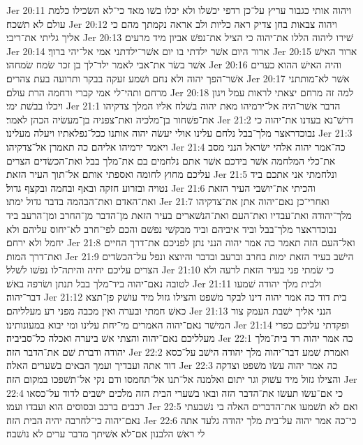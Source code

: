 Jer 20:11  ויהוה אותי כגבור עריץ על־כן רדפי יכשׁלו ולא יכלו בשׁו מאד כי־לא השׂכילו כלמת עולם לא תשׁכח׃
Jer 20:12  ויהוה צבאות בחן צדיק ראה כליות ולב אראה נקמתך מהם כי אליך גליתי את־ריבי׃
Jer 20:13  שׁירו ליהוה הללו את־יהוה כי הציל את־נפשׁ אביון מיד מרעים׃
Jer 20:14  ארור היום אשׁר ילדתי בו יום אשׁר־ילדתני אמי אל־יהי ברוך׃
Jer 20:15  ארור האישׁ אשׁר בשׂר את־אבי לאמר ילד־לך בן זכר שׂמח שׂמחהו׃
Jer 20:16  והיה האישׁ ההוא כערים אשׁר־הפך יהוה ולא נחם ושׁמע זעקה בבקר ותרועה בעת צהרים׃
Jer 20:17  אשׁר לא־מותתני מרחם ותהי־לי אמי קברי ורחמה הרת עולם׃
Jer 20:18  למה זה מרחם יצאתי לראות עמל ויגון ויכלו בבשׁת ימי׃
Jer 21:1  הדבר אשׁר־היה אל־ירמיהו מאת יהוה בשׁלח אליו המלך צדקיהו את־פשׁחור בן־מלכיה ואת־צפניה בן־מעשׂיה הכהן לאמר׃
Jer 21:2  דרשׁ־נא בעדנו את־יהוה כי נבוכדראצר מלך־בבל נלחם עלינו אולי יעשׂה יהוה אותנו ככל־נפלאתיו ויעלה מעלינו׃
Jer 21:3  ויאמר ירמיהו אליהם כה תאמרן אל־צדקיהו׃
Jer 21:4  כה־אמר יהוה אלהי ישׂראל הנני מסב את־כלי המלחמה אשׁר בידכם אשׁר אתם נלחמים בם את־מלך בבל ואת־הכשׂדים הצרים עליכם מחוץ לחומה ואספתי אותם אל־תוך העיר הזאת׃
Jer 21:5  ונלחמתי אני אתכם ביד נטויה ובזרוע חזקה ובאף ובחמה ובקצף גדול׃
Jer 21:6  והכיתי את־יושׁבי העיר הזאת ואת־האדם ואת־הבהמה בדבר גדול ימתו׃
Jer 21:7  ואחרי־כן נאם־יהוה אתן את־צדקיהו מלך־יהודה ואת־עבדיו ואת־העם ואת־הנשׁארים בעיר הזאת מן־הדבר מן־החרב ומן־הרעב ביד נבוכדראצר מלך־בבל וביד איביהם וביד מבקשׁי נפשׁם והכם לפי־חרב לא־יחוס עליהם ולא יחמל ולא ירחם׃
Jer 21:8  ואל־העם הזה תאמר כה אמר יהוה הנני נתן לפניכם את־דרך החיים ואת־דרך המות׃
Jer 21:9  הישׁב בעיר הזאת ימות בחרב וברעב ובדבר והיוצא ונפל על־הכשׂדים הצרים עליכם יחיה והיתה־לו נפשׁו לשׁלל׃
Jer 21:10  כי שׂמתי פני בעיר הזאת לרעה ולא לטובה נאם־יהוה ביד־מלך בבל תנתן ושׂרפה באשׁ׃
Jer 21:11  ולבית מלך יהודה שׁמעו דבר־יהוה׃
Jer 21:12  בית דוד כה אמר יהוה דינו לבקר משׁפט והצילו גזול מיד עושׁק פן־תצא כאשׁ חמתי ובערה ואין מכבה מפני רע מעלליהם׃
Jer 21:13  הנני אליך ישׁבת העמק צור המישׁר נאם־יהוה האמרים מי־יחת עלינו ומי יבוא במעונותינו׃
Jer 21:14  ופקדתי עליכם כפרי מעלליכם נאם־יהוה והצתי אשׁ ביערה ואכלה כל־סביביה׃
Jer 22:1  כה אמר יהוה רד בית־מלך יהודה ודברת שׁם את־הדבר הזה׃
Jer 22:2  ואמרת שׁמע דבר־יהוה מלך יהודה הישׁב על־כסא דוד אתה ועבדיך ועמך הבאים בשׁערים האלה׃
Jer 22:3  כה אמר יהוה עשׂו משׁפט וצדקה והצילו גזול מיד עשׁוק וגר יתום ואלמנה אל־תנו אל־תחמסו ודם נקי אל־תשׁפכו במקום הזה׃
Jer 22:4  כי אם־עשׂו תעשׂו את־הדבר הזה ובאו בשׁערי הבית הזה מלכים ישׁבים לדוד על־כסאו רכבים ברכב ובסוסים הוא ועבדו ועמו׃
Jer 22:5  ואם לא תשׁמעו את־הדברים האלה בי נשׁבעתי נאם־יהוה כי־לחרבה יהיה הבית הזה׃
Jer 22:6  כי־כה אמר יהוה על־בית מלך יהודה גלעד אתה לי ראשׁ הלבנון אם־לא אשׁיתך מדבר ערים לא נושׁבה׃
